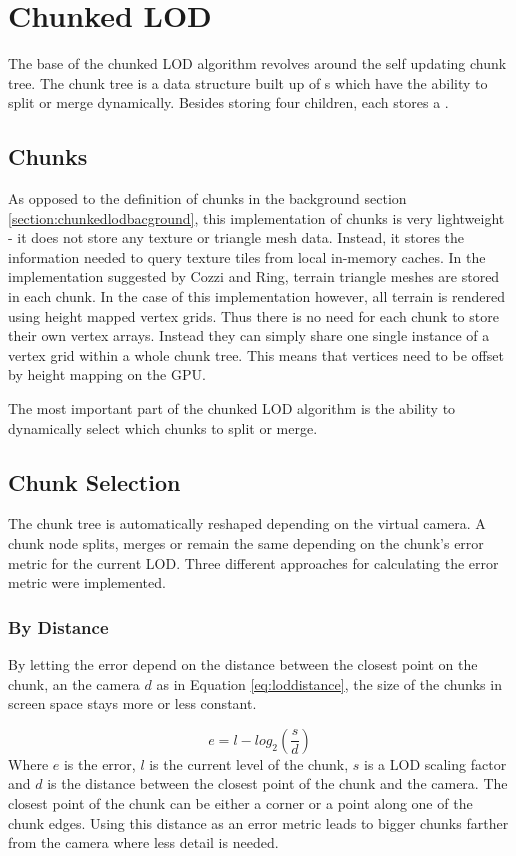 \section{Chunked LOD}
The base of the chunked LOD algorithm revolves around the self updating chunk tree. The chunk tree is a data structure built up of s which have the ability to split or merge dynamically. Besides storing four  children, each  stores a .

\subsection{Chunks}
As opposed to the definition of chunks in the background section \ref{section:chunkedlodbacground}, this implementation of chunks is very lightweight - it does not store any texture or triangle mesh data. Instead, it stores the information needed to query texture tiles from local in-memory caches. In the implementation suggested by Cozzi and Ring, terrain triangle meshes are stored in each chunk. In the case of this implementation however, all terrain is rendered using height mapped vertex grids. Thus there is no need for each chunk to store their own vertex arrays. Instead they can simply share one single instance of a vertex grid within a whole chunk tree. This means that vertices need to be offset by height mapping on the GPU.

The most important part of the chunked LOD algorithm is the ability to dynamically select which chunks to split or merge. 

\subsection{Chunk Selection}
The chunk tree is automatically reshaped depending on the virtual camera. A chunk node splits, merges or remain the same depending on the chunk's error metric for the current LOD. Three different approaches for calculating the error metric were implemented.

\subsubsection{By Distance}
By letting the error depend on the distance between the closest point on the chunk, an the camera $d$ as in Equation \ref{eq:loddistance}, the size of the chunks in screen space stays more or less constant.

\begin{equation}
	\label{eq:loddistance}
	e = l - log_2(\frac{s}{d})
\end{equation}
Where $e$ is the error, $l$ is the current level of the chunk, $s$ is a LOD scaling factor and $d$ is the distance between the closest point of the chunk and the camera. The closest point of the chunk can be either a corner or a point along one of the chunk edges. Using this distance as an error metric leads to bigger chunks farther from the camera where less detail is needed.


